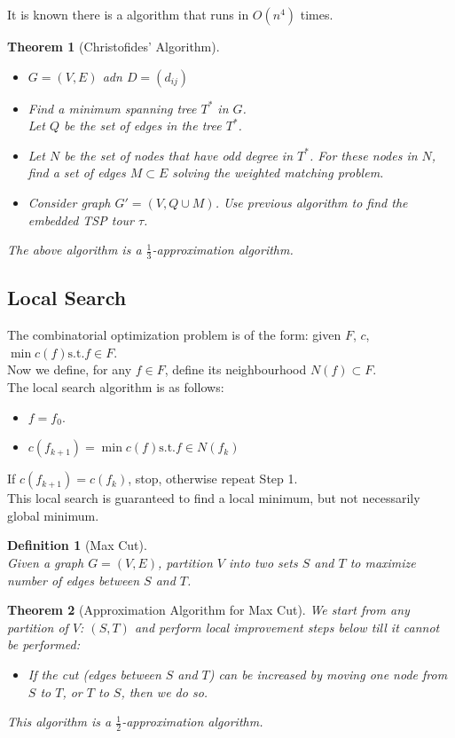 \documentclass[12pt]{article}
\newcommand{\st}{\mathrm{s.t.}}
\newtheorem{definition}{Definition}[section]
\newtheorem{theorem}{Theorem}[section]
\theoremstyle{definition}
\begin{document}
It is known there is a algorithm that runs in $O(n^4)$ times.
\begin{theorem}[Christofides' Algorithm]
\hfill\\\normalfont
\begin{itemize}
  \item[Step 0] $G=(V,E)$ adn $D=(d_{ij})$
  \item[Step 1] Find a minimum spanning tree $T^\ast$ in $G$. \\Let $Q$ be the set of edges in the tree $T^\ast$.
  \item[Step 2] Let $N$ be the set of nodes that have odd degree in $T^\ast$. For these nodes in $N$, find a set of edges $M\subset E$ solving the weighted matching problem.
  \item Consider graph $G'=(V,Q\cup M)$. Use previous algorithm to find the embedded TSP tour $\tau$.
\end{itemize}
The above algorithm is a $\frac{1}{3}$-approximation algorithm.
\end{theorem}
\subsection{Local Search}
The combinatorial optimization problem is of the form: given $F$, $c$, $\min c(f)\st f\in F$. \\
Now we define, for any $f\in F$, define its neighbourhood $N(f)\subset F$.\\
The local search algorithm is as follows:
\begin{itemize}
  \item[Step 0] $f=f_0$.
  \item[Step 1] $c(f_{k+1})=\min c(f)\st f\in N(f_k)$
\end{itemize}
If $c(f_{k+1})=c(f_k)$, stop, otherwise repeat Step 1.\\
This local search is guaranteed to find a local minimum, but not necessarily global minimum.\\
\begin{definition}[Max Cut]
\hfill\\\normalfont Given a graph $G=(V,E)$, partition $V$ into two sets $S$ and $T$ to maximize number of edges between $S$ and $T$.
\end{definition}
\begin{theorem}[Approximation Algorithm for Max Cut]
We start from any partition of $V$: $(S,T)$ and perform local improvement steps below till it cannot be performed:
\begin{itemize}
  \item If the cut (edges between $S$ and $T$) can be increased by moving one node from $S$ to $T$, or $T$ to $S$, then we do so.
\end{itemize}
This algorithm is a $\frac{1}{2}$-approximation algorithm.
\end{theorem}
\end{document}
